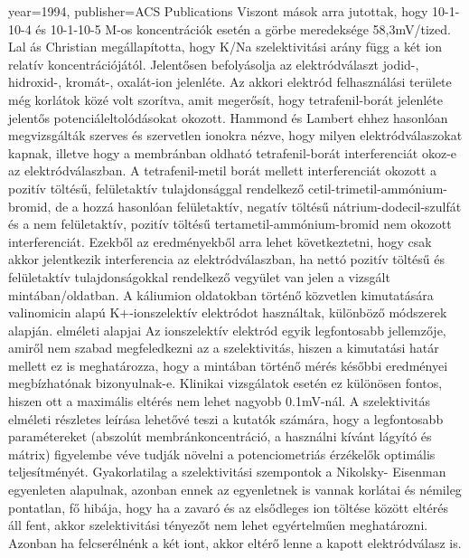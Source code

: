 {{  year={1994},
  publisher={ACS Publications}
}
Viszont mások arra jutottak, hogy 10-1-10-4 és 10-1-10-5 M-os koncentrációk esetén a görbe meredeksége 58,3mV/tized. Lal ás Christian megállapította, hogy K/Na szelektivitási arány függ a két ion relatív koncentrációjától. Jelentősen befolyásolja az elektródválaszt jodid-, hidroxid-, kromát-, oxalát-ion jelenléte. Az akkori elektród felhasználási területe még korlátok közé volt szorítva, amit megerősít, hogy tetrafenil-borát jelenléte jelentős potenciáleltolódásokat okozott. Hammond és Lambert ehhez hasonlóan megvizsgálták szerves és szervetlen ionokra nézve, hogy milyen elektródválaszokat kapnak, illetve hogy a membránban oldható tetrafenil-borát interferenciát okoz-e az elektródválaszban. A tetrafenil-metil borát mellett interferenciát okozott a pozitív töltésű, felületaktív tulajdonsággal rendelkező cetil-trimetil-ammónium-bromid, de a hozzá hasonlóan felületaktív, negatív töltésű nátrium-dodecil-szulfát és a nem felületaktív, pozitív töltésű tertametil-ammónium-bromid nem okozott interferenciát. Ezekből az eredményekből arra lehet következtetni, hogy csak akkor jelentkezik interferencia az elektródválaszban, ha nettó pozitív töltésű és felületaktív tulajdonságokkal rendelkező vegyület van jelen a vizsgált mintában/oldatban. A káliumion oldatokban történő közvetlen kimutatására valinomicin alapú K+-ionszelektív elektródot használtak, különböző módszerek alapján.  
 elméleti alapjai
Az ionszelektív elektród egyik legfontosabb jellemzője, amiről nem szabad megfeledkezni az a szelektivitás, hiszen a kimutatási határ mellett ez is meghatározza, hogy a mintában történő mérés későbbi eredményei megbízhatónak bizonyulnak-e. Klinikai vizsgálatok esetén ez különösen fontos, hiszen ott a maximális eltérés nem lehet nagyobb 0.1mV-nál.  A szelektivitás elméleti részletes leírása lehetővé teszi a kutatók számára, hogy a legfontosabb paramétereket (abszolút membránkoncentráció, a használni kívánt lágyító és mátrix) figyelembe véve tudják növelni a potenciometriás érzékelők optimális teljesítményét. Gyakorlatilag a szelektivitási szempontok a Nikolsky- Eisenman egyenleten alapulnak, azonban ennek az egyenletnek is vannak korlátai és némileg pontatlan, fő hibája, hogy ha a zavaró és az elsődleges ion töltése között eltérés áll fent, akkor szelektivitási tényezőt nem lehet egyértelműen meghatározni. Azonban ha felcserélnénk a két iont, akkor eltérő lenne a kapott elektródválasz is.}
